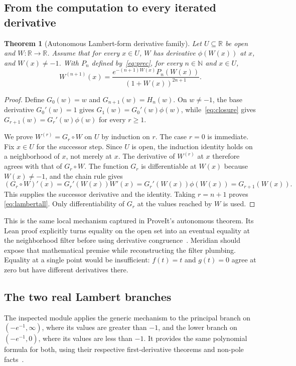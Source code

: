 \documentclass[11pt,a4paper]{article}
\newcommand{\R}{\mathbb R}
\newcommand{\N}{\mathbb N}
\newtheorem{theorem}[proposition]{Theorem}
\theoremstyle{remark}
\begin{document}
\subsection{From the computation to every iterated derivative}
\begin{theorem}[Autonomous Lambert-form derivative family]
Let $U\subseteq\R$ be open and $W:\R\to\R$. Assume that for every $x\in U$,
$W$ has derivative $\phi(W(x))$ at $x$, and $W(x)\ne-1$. With $P_n$ defined
by~\eqref{eq:prec}, for every $n\in\N$ and $x\in U$,
\begin{equation}
 W^{(n+1)}(x)=
 \frac{e^{-(n+1)W(x)}P_n(W(x))}{(1+W(x))^{2n+1}}.
 \label{eq:lambertall}
\end{equation}
\end{theorem}
\begin{proof}
Define $G_0(w)=w$ and $G_{n+1}(w)=H_n(w)$. On $w\ne-1$, the base derivative
$G_0'(w)=1$ gives $G_1(w)=G_0'(w)\phi(w)$, while~\eqref{eq:closure} gives
$G_{r+1}(w)=G_r'(w)\phi(w)$ for every $r\ge1$.

We prove $W^{(r)}=G_r\circ W$ on $U$ by induction on $r$. The case $r=0$ is
immediate. Fix $x\in U$ for the successor step. Since $U$ is open, the induction
identity holds on a neighborhood of $x$, not merely at $x$. The derivative of
$W^{(r)}$ at $x$ therefore agrees with that of $G_r\circ W$. The function $G_r$
is differentiable at $W(x)$ because $W(x)\ne-1$, and the chain rule gives
\[
 (G_r\circ W)'(x)=G_r'(W(x))W'(x)
                =G_r'(W(x))\phi(W(x))
                =G_{r+1}(W(x)).
\]
This supplies the successor derivative and the identity. Taking $r=n+1$ proves
\eqref{eq:lambertall}. Only differentiability of $G_r$ at the values reached by
$W$ is used.
\end{proof}

This is the same local mechanism captured in ProveIt's autonomous theorem. Its
Lean proof explicitly turns equality on the open set into an eventual equality
at the neighborhood filter before using derivative congruence~\cite{pautonomous}.
Meridian should expose that mathematical premise while reconstructing the filter
plumbing. Equality at a single point would be insufficient: $f(t)=t$ and $g(t)=0$
agree at zero but have different derivatives there.

\subsection{The two real Lambert branches}
The inspected module applies the generic mechanism to the principal branch on
$(-e^{-1},\infty)$, where its values are greater than $-1$, and the lower branch
on $(-e^{-1},0)$, where its values are less than $-1$. It provides the same
polynomial formula for both, using their respective first-derivative theorems
and non-pole facts~\cite{plambert}.
\end{document}
